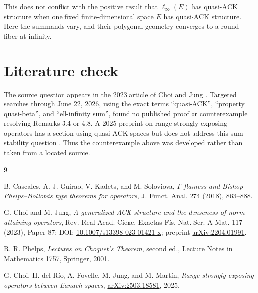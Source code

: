 \documentclass[11pt]{article}
\theoremstyle{definition}
\newcommand{\ACK}{\mathrm{ACK}}
\begin{document}
This does not conflict with the positive result that $\ell_\infty(E)$ has
quasi-$\ACK$ structure when one fixed finite-dimensional space $E$ has
quasi-$\ACK$ structure.  Here the summands vary, and their polygonal geometry
converges to a round fiber at infinity.

\section{Literature check}

The source question appears in the 2023 article of Choi and Jung
\cite{ChoiJung}.  Targeted searches through June 22, 2026, using the exact
terms ``quasi-ACK'', ``property quasi-beta'', and ``ell-infinity sum'', found
no published proof or counterexample resolving Remarks 3.4 or 4.8.  A 2025
preprint on range strongly exposing operators has a section using
quasi-$\ACK$ spaces but does not address this sum-stability question
\cite{RSE}.  Thus the counterexample above was developed rather than taken
from a located source.

\begin{thebibliography}{9}

B. Cascales, A. J. Guirao, V. Kadets, and M. Soloviova,
\emph{$\Gamma$-flatness and Bishop--Phelps--Bollob\'as type theorems for
operators}, J. Funct. Anal. 274 (2018), 863--888.

G. Choi and M. Jung,
\emph{A generalized ACK structure and the denseness of norm attaining
operators}, Rev. Real Acad. Cienc. Exactas F\'is. Nat. Ser. A-Mat. 117
(2023), Paper 87; DOI: \href{https://doi.org/10.1007/s13398-023-01421-x}
{10.1007/s13398-023-01421-x}; preprint
\href{https://arxiv.org/abs/2204.01991}{arXiv:2204.01991}.

R. R. Phelps,
\emph{Lectures on Choquet's Theorem}, second ed., Lecture Notes in
Mathematics 1757, Springer, 2001.

G. Choi, H. del R\'io, A. Fovelle, M. Jung, and M. Mart\'in,
\emph{Range strongly exposing operators between Banach spaces},
\href{https://arxiv.org/abs/2503.18581}{arXiv:2503.18581}, 2025.

\end{thebibliography}
\end{document}
